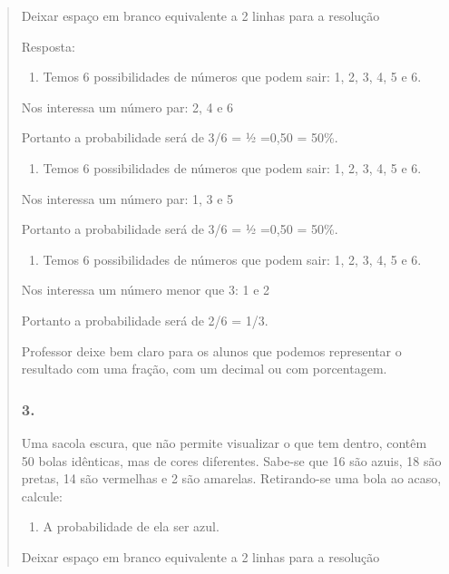 \begin{enumerate}
\begin{escolha}
\begin{enumerate}
\begin{itemize}
\begin{itemize}
\begin{escolha}
\begin{quote}
\begin{escolha}
Deixar espaço em branco equivalente a 2 linhas para a resolução

Resposta:

\begin{enumerate}
\def\labelenumi{\alph{enumi})}
\item
  Temos 6 possibilidades de números que podem sair: 1, 2, 3, 4, 5 e 6.
\end{enumerate}

Nos interessa um número par: 2, 4 e 6

Portanto a probabilidade será de 3/6 = ½ =0,50 = 50\%.

\begin{enumerate}
\def\labelenumi{\alph{enumi})}
\item
  Temos 6 possibilidades de números que podem sair: 1, 2, 3, 4, 5 e 6.
\end{enumerate}

Nos interessa um número par: 1, 3 e 5

Portanto a probabilidade será de 3/6 = ½ =0,50 = 50\%.

\begin{enumerate}
\def\labelenumi{\alph{enumi})}
\item
  Temos 6 possibilidades de números que podem sair: 1, 2, 3, 4, 5 e 6.
\end{enumerate}

Nos interessa um número menor que 3: 1 e 2

Portanto a probabilidade será de 2/6 = 1/3.

Professor deixe bem claro para os alunos que podemos representar o
resultado com uma fração, com um decimal ou com porcentagem.

\subsubsection{3.}\label{section-80}

Uma sacola escura, que não permite visualizar o que tem dentro, contêm
50 bolas idênticas, mas de cores diferentes. Sabe-se que 16 são azuis,
18 são pretas, 14 são vermelhas e 2 são amarelas. Retirando-se uma bola
ao acaso, calcule:

\begin{enumerate}
\def\labelenumi{\alph{enumi})}
\item
  A probabilidade de ela ser azul.
\end{enumerate}

Deixar espaço em branco equivalente a 2 linhas para a resolução


\end{escolha}
\end{quote}
\end{escolha}
\end{itemize}
\end{itemize}
\end{enumerate}
\end{escolha}
\end{enumerate}
